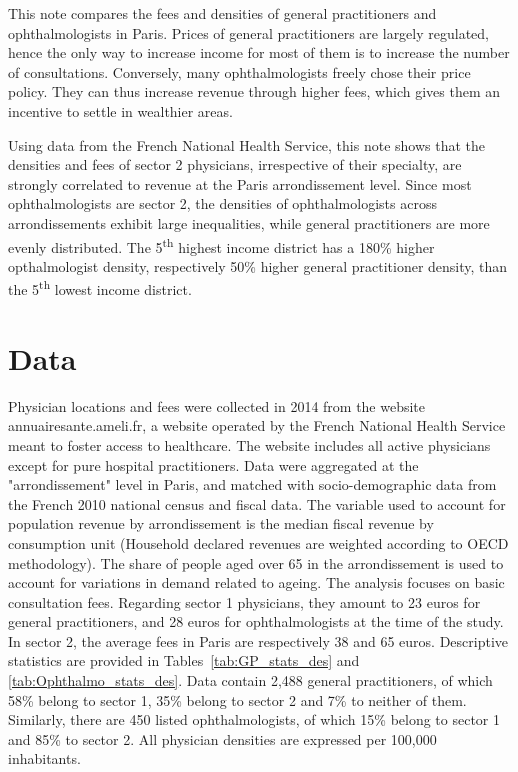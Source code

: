 \documentclass[11pt]{article}
\begin{document}
This note compares the fees and densities of general practitioners and ophthalmologists in Paris. Prices of general practitioners are largely regulated, hence the only way to increase income for most of them is to increase the number of consultations. Conversely, many ophthalmologists freely chose their price policy. They can thus increase revenue through higher fees, which gives them an incentive to settle in wealthier areas.

Using data from the French National Health Service, this note shows that the densities and fees of sector 2 physicians, irrespective of their specialty, are strongly correlated to revenue at the Paris arrondissement level. Since most ophthalmologists are sector 2, the densities of ophthalmologists across arrondissements exhibit large inequalities, while general practitioners are more evenly distributed. The 5\textsuperscript{th} highest income district has a 180\% higher opthalmologist density, respectively 50\% higher general practitioner density, than the 5\textsuperscript{th} lowest income district.

\section{Data}

Physician locations and fees were collected in 2014 from the website annuairesante.ameli.fr, a website operated by the French National Health Service meant to foster access to healthcare. The website includes all active physicians except for pure hospital practitioners. Data were aggregated at the "arrondissement" level in Paris, and matched with socio-demographic data from the French 2010 national census and fiscal data. The variable used to account for population revenue by arrondissement is the median fiscal revenue by consumption unit (Household declared revenues are weighted according to OECD methodology). The share of people aged over 65 in the arrondissement is used to account for variations in demand related to ageing. The analysis focuses on basic consultation fees. Regarding sector 1 physicians, they amount to 23 euros for general practitioners, and 28 euros for ophthalmologists at the time of the study. In sector 2, the average fees in Paris are respectively 38 and 65 euros. Descriptive statistics are provided in Tables~\ref{tab:GP_stats_des} and \ref{tab:Ophthalmo_stats_des}. Data contain 2,488 general practitioners, of which 58\% belong to sector 1, 35\% belong to sector 2 and 7\% to neither of them. Similarly, there are 450 listed ophthalmologists, of which 15\% belong to sector 1 and 85\% to sector 2. All physician densities are expressed per 100,000 inhabitants.
\end{document}
